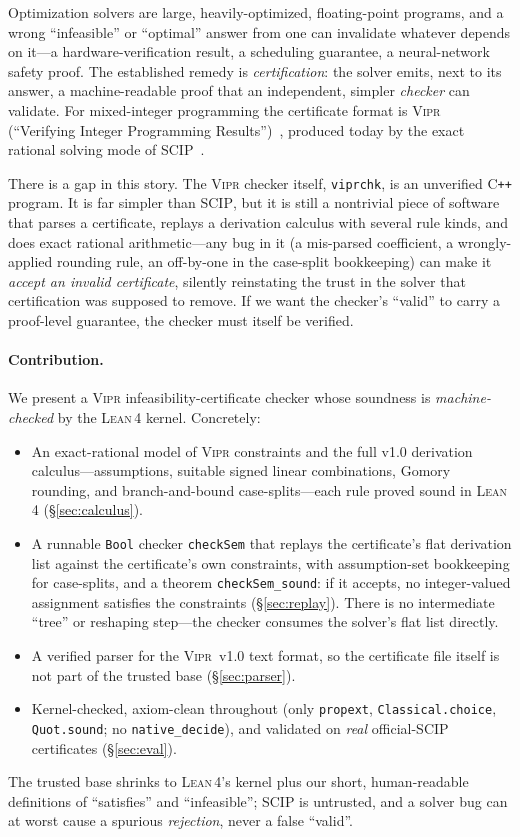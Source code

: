 \documentclass[runningheads]{llncs}
\newcommand{\code}[1]{\texttt{#1}}
\newcommand{\scip}{\textsc{SCIP}}
\newcommand{\vipr}{\textsc{Vipr}}
\newcommand{\lean}{\textsc{Lean\,4}}
\begin{document}
Optimization solvers are large, heavily-optimized, floating-point programs, and a wrong
``infeasible'' or ``optimal'' answer from one can invalidate whatever depends on it---a
hardware-verification result, a scheduling guarantee, a neural-network safety proof. The
established remedy is \emph{certification}: the solver emits, next to its answer, a
machine-readable proof that an independent, simpler \emph{checker} can validate. For
mixed-integer programming the certificate format is \vipr{} (``Verifying Integer
Programming Results'')~\cite{vipr}, produced today by the exact rational solving mode of
\scip{}~\cite{eifler,scip}.

There is a gap in this story. The \vipr{} checker itself, \code{viprchk}, is an
unverified C\texttt{++} program. It is far simpler than \scip{}, but it is still a
nontrivial piece of software that parses a certificate, replays a derivation calculus
with several rule kinds, and does exact rational arithmetic---any bug in it (a
mis-parsed coefficient, a wrongly-applied rounding rule, an off-by-one in the
case-split bookkeeping) can make it \emph{accept an invalid certificate}, silently
reinstating the trust in the solver that certification was supposed to remove. If we
want the checker's ``valid'' to carry a proof-level guarantee, the checker must itself be
verified.

\paragraph{Contribution.} We present a \vipr{} infeasibility-certificate checker whose
soundness is \emph{machine-checked} by the \lean{} kernel. Concretely:
\begin{itemize}
\item An exact-rational model of \vipr{} constraints and the full v1.0 derivation
      calculus---assumptions, suitable signed linear combinations, Gomory rounding, and
      branch-and-bound case-splits---each rule proved sound in \lean{}
      (\S\ref{sec:calculus}).
\item A runnable \code{Bool} checker \code{checkSem} that replays the certificate's flat
      derivation list against the certificate's own constraints, with assumption-set
      bookkeeping for case-splits, and a theorem \code{checkSem\_sound}: if it accepts,
      no integer-valued assignment satisfies the constraints (\S\ref{sec:replay}). There
      is no intermediate ``tree'' or reshaping step---the checker consumes the solver's
      flat list directly.
\item A verified parser for the \vipr~v1.0 text format, so the certificate file itself
      is not part of the trusted base (\S\ref{sec:parser}).
\item Kernel-checked, axiom-clean throughout (only \code{propext},
      \code{Classical.choice}, \code{Quot.sound}; no \code{native\_decide}), and
      validated on \emph{real} official-\scip{} certificates (\S\ref{sec:eval}).
\end{itemize}
The trusted base shrinks to \lean{}'s kernel plus our short, human-readable definitions
of ``satisfies'' and ``infeasible''; \scip{} is untrusted, and a solver bug can at worst
cause a spurious \emph{rejection}, never a false ``valid''.
\end{document}
